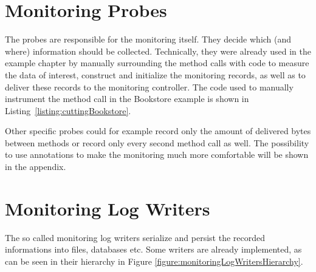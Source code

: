 \setJavaCodeListing



\section{Monitoring Probes}\label{sec:monitoring:probe}

The probes are responsible for the monitoring itself. They decide which (and where) information should be collected. Technically, they were already used in the example chapter by manually surrounding the method calls with code to measure the data of interest, %
construct and initialize the monitoring records, as well as to deliver these records to the monitoring controller. %
The code used to manually instrument the method call in the Bookstore example is %
shown in Listing~\ref{listing:cuttingBookstore}. %


		

		\noindent Other specific probes could for example record only the amount of delivered bytes between methods or record only every second method call as well. The possibility to use annotations to make the monitoring much more comfortable will be shown in the appendix.

\section{Monitoring Log Writers}\label{sec:monitoring-log-writers}

		The so called monitoring log writers serialize and persist the recorded informations into files, databases etc. %
		Some writers are already implemented, as can be seen in their hierarchy in Figure \ref{figure:monitoringLogWritersHierarchy}.

